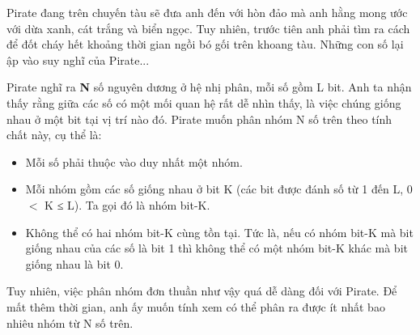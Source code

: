Pirate đang trên chuyến tàu sẽ đưa anh đến với hòn đảo mà anh hằng mong ước với dừa xanh, cát trắng và biển ngọc. Tuy nhiên, trước tiên anh phải tìm ra cách để đốt cháy hết khoảng thời gian ngồi bó gối trên khoang tàu. Những con số lại ập vào suy nghĩ của Pirate...  

   Pirate nghĩ ra   \textbf{    N   }   số nguyên dương ở hệ nhị phân, mỗi số gồm L bit. Anh ta nhận thấy rằng giữa các số có một mối quan hệ rất dễ nhìn thấy, là việc chúng giống nhau ở một bit tại vị trí nào đó. Pirate muốn phân nhóm N số trên theo tính chất này, cụ thể là:  
\begin{itemize}
	\item     Mỗi số phải thuộc vào duy nhất một nhóm.   
	\item     Mỗi nhóm gồm các số giống nhau ở bit K (các bit được đánh số từ 1 đến L, 0 $<$ K ≤ L). Ta gọi đó là nhóm bit-K.   
	\item     Không thể có hai nhóm bit-K cùng tồn tại. Tức là, nếu có nhóm bit-K mà bit giống nhau của các số là bit 1 thì không thể có một nhóm bit-K khác mà bit giống nhau là bit 0.   
\end{itemize}

   Tuy nhiên, việc phân nhóm đơn thuần như vậy quá dễ dàng đối với Pirate. Để mất thêm thời gian, anh ấy muốn tính xem có thể phân ra được ít nhất bao nhiêu nhóm từ N số trên.